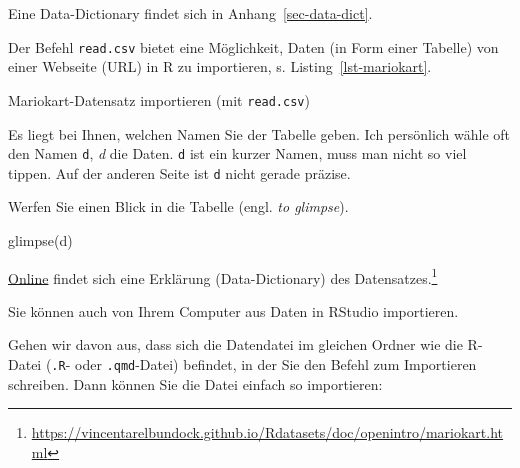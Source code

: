 \documentclass[
  letterpaper,
  twoside,
  open=any]{scrbook}
\newenvironment{Shaded}{\begin{snugshade}}{\end{snugshade}}
\newcommand{\FunctionTok}[1]{\textcolor[rgb]{0.28,0.35,0.67}{#1}}
\newcommand{\NormalTok}[1]{\textcolor[rgb]{0.00,0.23,0.31}{#1}}
\newcommand{\OtherTok}[1]{\textcolor[rgb]{0.00,0.23,0.31}{#1}}
\newcommand{\StringTok}[1]{\textcolor[rgb]{0.13,0.47,0.30}{#1}}
\theoremstyle{definition}
\theoremstyle{definition}
\theoremstyle{definition}
\theoremstyle{remark}
\begin{document}
Eine Data-Dictionary findet sich in Anhang~\ref{sec-data-dict}.

Der Befehl \texttt{read.csv} bietet eine Möglichkeit, Daten (in Form
einer Tabelle) von einer Webseite (URL) in R zu importieren, s.
Listing~\ref{lst-mariokart}.

\begin{codelisting}

\caption{\label{lst-mariokart}Mariokart-Datensatz importieren (mit
\texttt{read.csv})}

\centering{

\begin{Shaded}
\begin{Highlighting}[]
\NormalTok{mariokart }\OtherTok{\textless{}{-}} \FunctionTok{read.csv}\NormalTok{(}\FunctionTok{paste0}\NormalTok{(}
  \StringTok{"https://vincentarelbundock.github.io/Rdatasets/"}\NormalTok{,}
  \StringTok{"csv/openintro/mariokart.csv"}\NormalTok{))}
\end{Highlighting}
\end{Shaded}

}

\end{codelisting}%

Es liegt bei Ihnen, welchen Namen Sie der Tabelle geben. Ich persönlich
wähle oft den Namen \texttt{d}, \emph{d} die Daten. \texttt{d} ist ein
kurzer Namen, muss man nicht so viel tippen. Auf der anderen Seite ist
\texttt{d} nicht gerade präzise.

Werfen Sie einen Blick in die Tabelle (engl. \emph{to glimpse}).

\begin{Shaded}
\begin{Highlighting}[]
\FunctionTok{glimpse}\NormalTok{(d)}
\end{Highlighting}
\end{Shaded}

\href{https://vincentarelbundock.github.io/Rdatasets/doc/openintro/mariokart.html}{Online}
findet sich eine Erklärung (Data-Dictionary) des Datensatzes.\footnote{\url{https://vincentarelbundock.github.io/Rdatasets/doc/openintro/mariokart.html}}

Sie können auch von Ihrem Computer aus Daten in RStudio importieren.

Gehen wir davon aus, dass sich die Datendatei im gleichen Ordner wie die
R-Datei (\texttt{.R}- oder \texttt{.qmd}-Datei) befindet, in der Sie den
Befehl zum Importieren schreiben. Dann können Sie die Datei einfach so
importieren:
\end{document}
